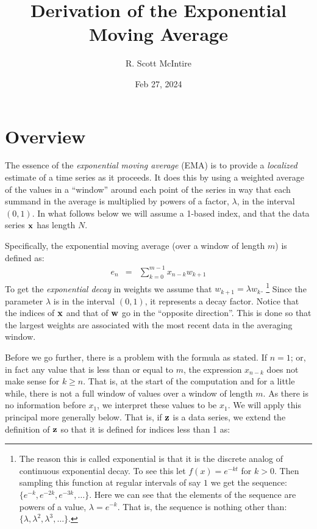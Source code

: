 \documentclass{article}
\title{Derivation of the Exponential Moving Average}
\author{R. Scott McIntire}
\date{Feb 27, 2024}
\begin{document}

\maketitle

\section{Overview}

The essence of the {\em exponential moving average\/} (EMA) is to provide 
a {\em localized\/} estimate of a time series as it proceeds. It does 
this by using a weighted average of the values in a ``window'' around each point 
of the series in way that each summand in 
the average is multiplied by powers of a factor, $\lambda$,
in the interval $(0,1)$.
In what follows below we will assume a 1-based index, and that 
the data series ${\bf x}$ has length $N$.

Specifically, the exponential moving average (over a window of length $m$) 
is defined as:
\begin{eqnarray}
    e_n &=& \sum_{k=0}^{m-1} x_{n-k} w_{k+1}  \label{ema_def}
\end{eqnarray}
To get the {\em exponential decay\/} in weights we assume that $w_{k+1} = \lambda w_k$.%
\footnote{The reason this is called exponential is that it is the discrete
analog of continuous exponential decay. To see this let $f(x) = e^{-kt}$ 
for $k > 0$. Then sampling this function at regular intervals of say $1$ 
we get the sequence: $\{ e^{-k}, e^{-2k}, e^{-3k}, \ldots \}$.
Here we can see that the elements of the sequence are powers of a value, $\lambda = e^{-k}$.
That is, the sequence is nothing other than: $\{\lambda, \lambda^2, \lambda^3, \ldots \}$.}
Since the parameter $\lambda$ is in the interval $(0,1)$, it represents a decay factor. 
Notice that the indices of ${\bf x}$ and that of ${\bf w}$ go in the ``opposite direction''.
This is done so that the largest weights are associated with the most recent data
in the averaging window.

Before we go further, there is a problem with the formula as stated.
If $n = 1$; or, in fact any value that is less than or equal to $m$,
the expression $x_{n-k}$ does not make sense for $k \ge n$. That is, at the 
start of the computation and for a little while, there is not a full window
of values over a window of length $m$. As there is no information before $x_1$,
we interpret these values to be $x_1$. 
We will apply this principal more generally below. 
That is, if ${\bf z}$ is a data series,
we extend the definition of ${\bf z}$ so that it is defined for
indices less than 1 as:
\end{document}
